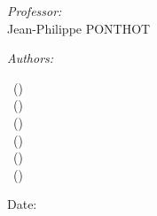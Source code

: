 \begin{titlepage}
\begin{center}
    \begin{minipage}{0.45\linewidth} %
        \raggedright %
        \normalsize \textit{Professor:} \\
            \small Jean-Philippe PONTHOT
    \end{minipage}
    \begin{minipage}{0.45\linewidth} %
        \raggedleft %
        \normalsize \textit{Authors:} \\
        \begin{small}
            \reportauthorOne~(\cidOne)\\
            \reportauthorTwo~(\cidTwo)\\
            \reportauthorThree~(\cidThree)\\
            \reportauthorFour~(\cidFour)\\
            \reportauthorFive~(\cidFive)\\
            \reportauthorSix~(\cidSix)\\
        \end{small}
    \end{minipage}
\end{center}


\vspace{4cm}
\makeatletter
Date: \@date 

\vfill %



\makeatother

\end{titlepage}

